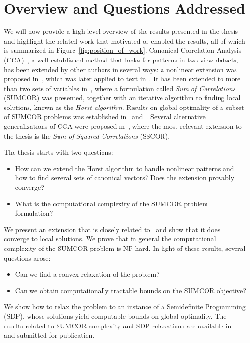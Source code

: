 \section{Overview and Questions Addressed}

We will now provide a high-level overview of the results presented in the thesis and highlight the related work
that motivated or enabled the results, all of which is summarized in Figure~\ref{fig:position_of_work}.
Canonical Correlation Analysis (CCA)~\cite{Hotelling}, a well established method that looks for patterns in two-view
datsets, has been extended by other authors in several ways: a nonlinear extension was proposed in~\cite{FBMJ}, which
was later applied to text in~\cite{vinokourov2002inferring}. It has been extended to more than two sets of variables
in~\cite{Horst}, where a formulation called \emph{Sum of Correlations} (SUMCOR) was presented, together with an iterative
algorithm to finding local solutions, known as the \emph{Horst algorithm}. Results on global optimality of a subset
of SUMCOR problems was established in~\cite{GlobalMEP} and~\cite{GlobalMEP2}. Several alternative generalizations
of CCA were proposed in~\cite{Kettenring}, where the most relevant extension to the thesis is the
\emph{Sum of Squared Correlations} (SSCOR).

The thesis starts with two questions:
\begin{itemize}
\item How can we extend the Horst algorithm to handle nonlinear patterns and how to find several sets of canonical vectors? Does the extension provably converge?
\item What is the computational complexity of the SUMCOR problem formulation?
\end{itemize}
We present an extension that is closely related to~\cite{FBMJ} and show that it does converge to local solutions. We prove that in
general the computational complexity of the SUMCOR problem is NP-hard.
 In light of these results, several questions arose:
\begin{itemize}
\item Can we find a convex relaxation of the problem?
\item Can we obtain computationally tractable bounds on the SUMCOR objective?
\end{itemize}
We show how to relax the problem to an instance of a Semidefinite Programming (SDP), whose solutions yield
computable bounds on global optimality. The results related to SUMCOR complexity and SDP relaxations
are available in~\cite{DBLP:journals/corr/abs-1302-0974} and submitted for publication.

